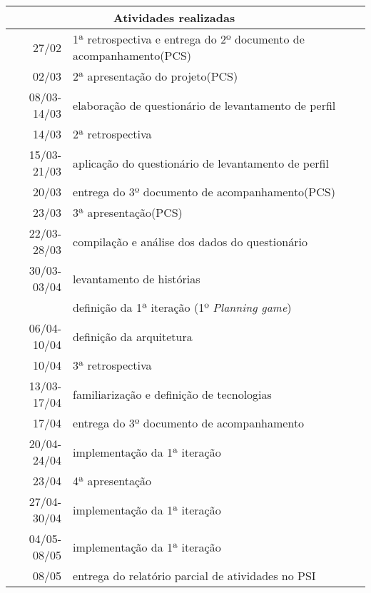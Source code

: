 \documentclass[a4paper,12pt,font=plain,header=plain]{abnt}
\begin{document}
	\begin{tabularx}{0.9\linewidth}[|l|]{ |r|X|l|X| }
	\hline
		\multicolumn{2}{|c|}{\textbf{Atividades realizadas}} \\
	\hline
		27/02 & 1ª retrospectiva e entrega do 2º documento de acompanhamento(PCS) \\
	\hline
		02/03 & 2ª apresentação do projeto(PCS) \\
	\hline
		08/03-14/03 & elaboração de questionário de levantamento de perfil \\
	\hline
		14/03 & 2ª retrospectiva \\
	\hline
		15/03-21/03 & aplicação do questionário de levantamento de perfil \\
	\hline
		20/03 & entrega do 3º documento de acompanhamento(PCS) \\
	\hline
		23/03 & 3ª apresentação(PCS) \\
	\hline
		22/03-28/03 & compilação e análise dos dados do questionário \\
	\hline
		30/03-03/04 & levantamento de histórias \\
			    & definição da 1ª iteração (1º \textit{Planning game}) \\
	\hline
		06/04-10/04 & definição da arquitetura \\
	\hline
		10/04 & 3ª retrospectiva \\
	\hline
		13/03-17/04 & familiarização e definição de tecnologias \\
	\hline
		17/04 & entrega do 3º documento de acompanhamento \\
	\hline
		20/04-24/04 & implementação da 1ª iteração \\
	\hline
		23/04 & 4ª apresentação \\
	\hline
		27/04-30/04 & implementação da 1ª iteração \\
	\hline
		04/05-08/05 & implementação da 1ª iteração \\
	\hline
		08/05 & entrega do relatório parcial de atividades no PSI \\
	\hline
	\end{tabularx} \\
\end{document}
